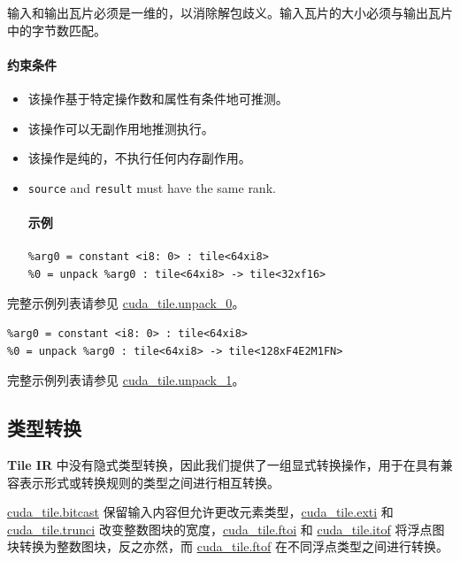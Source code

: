 \documentclass{article}
\begin{document}
输入和输出瓦片必须是一维的，以消除解包歧义。输入瓦片的大小必须与输出瓦片中的字节数匹配。



\paragraph{约束条件}

\begin{itemize}
\item 该操作基于特定操作数和属性有条件地可推测。
\item 该操作可以无副作用地推测执行。
\item 该操作是纯的，不执行任何内存副作用。
\item \texttt{source} and \texttt{result} must have the same rank.


\paragraph{示例}

\begin{lstlisting}
%arg0 = constant <i8: 0> : tile<64xi8>
%0 = unpack %arg0 : tile<64xi8> -> tile<32xf16>
\end{lstlisting}

\end{itemize}
完整示例列表请参见 \href{https://docs.nvidia.com/cuda/tile-ir/latest/sections/appendix.html#example-cuda-tile-unpack-0}{cuda\_tile.unpack\_0}。


\begin{lstlisting}
%arg0 = constant <i8: 0> : tile<64xi8>
%0 = unpack %arg0 : tile<64xi8> -> tile<128xF4E2M1FN>
\end{lstlisting}

完整示例列表请参见 \href{https://docs.nvidia.com/cuda/tile-ir/latest/sections/appendix.html#example-cuda-tile-unpack-1}{cuda\_tile.unpack\_1}。




\subsection{类型转换}

\textbf{Tile IR} 中没有隐式类型转换，因此我们提供了一组显式转换操作，用于在具有兼容表示形式或转换规则的类型之间进行相互转换。


\href{https://docs.nvidia.com/cuda/tile-ir/latest/sections/operations.html#op-cuda-tile-bitcast}{cuda\_tile.bitcast} 保留输入内容但允许更改元素类型，\href{https://docs.nvidia.com/cuda/tile-ir/latest/sections/operations.html#op-cuda-tile-exti}{cuda\_tile.exti} 和 \href{https://docs.nvidia.com/cuda/tile-ir/latest/sections/operations.html#op-cuda-tile-trunci}{cuda\_tile.trunci} 改变整数图块的宽度，\href{https://docs.nvidia.com/cuda/tile-ir/latest/sections/operations.html#op-cuda-tile-ftoi}{cuda\_tile.ftoi} 和 \href{https://docs.nvidia.com/cuda/tile-ir/latest/sections/operations.html#op-cuda-tile-itof}{cuda\_tile.itof} 将浮点图块转换为整数图块，反之亦然，而 \href{https://docs.nvidia.com/cuda/tile-ir/latest/sections/operations.html#op-cuda-tile-ftof}{cuda\_tile.ftof} 在不同浮点类型之间进行转换。
\end{document}
